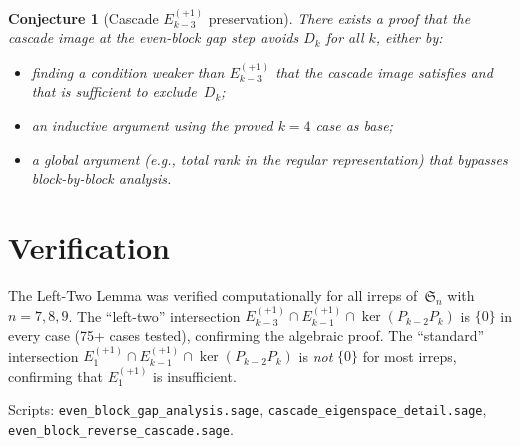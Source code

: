 \documentclass[11pt]{article}
\newtheorem{conjecture}[theorem]{Conjecture}
\theoremstyle{definition}
\theoremstyle{remark}
\newcommand{\Sym}{\mathfrak{S}}
\newcommand{\Eplus}[1]{E_{#1}^{(+1)}}
\newcommand{\kernel}{\operatorname{ker}}
\begin{document}
\begin{conjecture}[Cascade $\Eplus{k-3}$ preservation]
There exists a proof that the cascade image at the even-block gap step
avoids $D_k$ for all $k$, either by:
\begin{itemize}
  \item finding a condition weaker than $\Eplus{k-3}$ that the cascade
    image satisfies and that is sufficient to exclude~$D_k$;
  \item an inductive argument using the proved $k=4$ case as base;
  \item a global argument (e.g., total rank in the regular
    representation) that bypasses block-by-block analysis.
\end{itemize}
\end{conjecture}

\section{Verification}\label{sec:verify}

The Left-Two Lemma was verified computationally for all irreps
of~$\Sym_n$ with $n = 7, 8, 9$. The ``left-two'' intersection
$\Eplus{k-3} \cap \Eplus{k-1} \cap \kernel(P_{k-2}P_k)$ is
$\{0\}$ in every case (75+ cases tested), confirming the algebraic
proof. The ``standard'' intersection
$\Eplus{1} \cap \Eplus{k-1} \cap \kernel(P_{k-2}P_k)$ is
\emph{not} $\{0\}$ for most irreps, confirming that $\Eplus{1}$ is
insufficient.

Scripts: \texttt{even\_block\_gap\_analysis.sage},
\texttt{cascade\_eigenspace\_detail.sage},
\texttt{even\_block\_reverse\_cascade.sage}.
\end{document}
